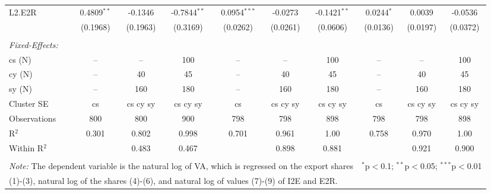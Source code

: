\documentclass[a4paper]{article}
\begin{document}
\begin{table}[h!]
{\begin{tabular}[t]{lccccccccc}
L2.E2R&0.4809$^{**}$ & -0.1346 & -0.7844$^{**}$ & 0.0954$^{***}$ & -0.0273 & -0.1421$^{**}$ & 0.0244$^{*}$ & 0.0039 & -0.0536\\
  &(0.1968) & (0.1963) & (0.3169) & (0.0262) & (0.0261) & (0.0606) & (0.0136) & (0.0197) & (0.0372)\\\\
\midrule \emph{Fixed-Effects:} &   &   &   &   &   &  \\
cs (N) & -- & -- & 100 & -- & -- & 100 & -- & -- & 100\\
cy (N) & -- & 40 & 45 & -- & 40 & 45 & -- & 40 & 45\\
sy (N) & -- & 160 & 180 & -- & 160 & 180 & -- & 160 & 180\\
\midrule
Cluster SE & cs & cs cy sy & cs cy sy & cs & cs cy sy & cs cy sy & cs & cs cy sy & cs cy sy\\
Observations & 800&800&900&798&798&898&798&798&898\\
R$^2$ & 0.301&0.802&0.998&0.701&0.961&1.00&0.758&0.970&1.00\\
Within R$^2$ & &0.483&0.467&&0.898&0.881&&0.921&0.900\\ \bottomrule \\[-1em]
\multicolumn{7}{l}{\small \textit{Note:} The dependent variable is the natural log of VA, which is regressed on the  export shares}   & \multicolumn{3}{r}{$^{*}$p$<$0.1; $^{**}$p$<$0.05; $^{***}$p$<$0.01} \\ [-0.2em]
\multicolumn{10}{l}{\small \quad \quad \quad (1)-(3), natural log of the shares (4)-(6), and natural log of values (7)-(9) of I2E and E2R.} \\
\end{tabular}
}
\end{table}
\FloatBarrier
\end{document}
